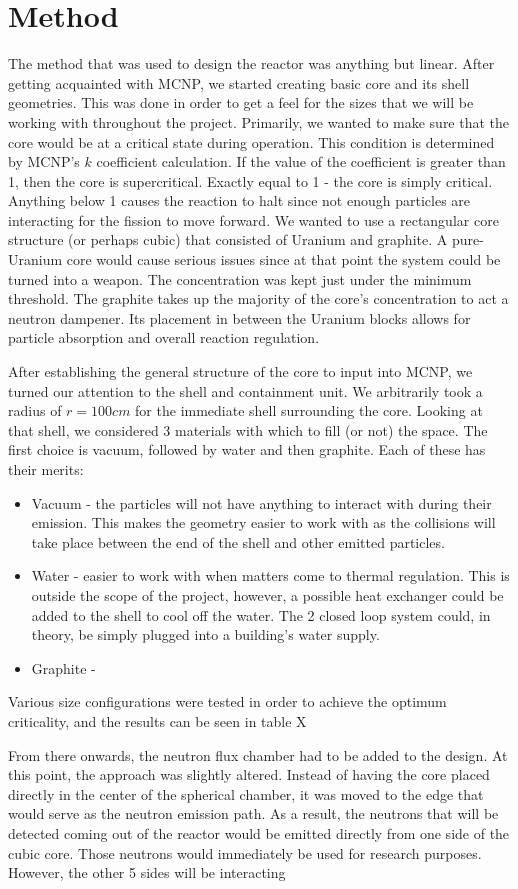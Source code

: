 \section*{Method}
The method that was used to design the reactor was anything but linear. After getting acquainted with MCNP, we started creating basic core and its shell geometries. This was done in order to get a feel for the sizes that we will be working with throughout the project. Primarily, we wanted to make sure that the core would be at a critical state during operation. This condition is determined by MCNP's $k$ coefficient calculation. If the value of the coefficient is greater than 1, then the core is supercritical. Exactly equal to 1 - the core is simply critical. Anything below 1 causes the reaction to halt since not enough particles are interacting for the fission to move forward. We wanted to use a rectangular core structure (or perhaps cubic) that consisted of Uranium and graphite. A pure-Uranium core would cause serious issues since at that point the system could be turned into a weapon. The concentration was kept just under the minimum threshold. The graphite takes up the majority of the core's concentration to act a neutron dampener. Its placement in between the Uranium blocks allows for particle absorption and overall reaction regulation.

After establishing the general structure of the core to input into MCNP, we turned our attention to the shell and containment unit. We arbitrarily took a radius of $r=100cm$ for the immediate shell surrounding the core. Looking at that shell, we considered 3 materials with which to fill (or not) the space. The first choice is vacuum, followed by water and then graphite. Each of these has their merits:
\begin{itemize}
\item Vacuum - the particles will not have anything to interact with during their emission. This makes the geometry easier to work with as the collisions will take place between the end of the shell and other emitted particles.
\item Water - easier to work with when matters come to thermal regulation. This is outside the scope of the project, however, a possible heat exchanger could be added to the shell to cool off the water. The 2 closed loop system could, in theory, be simply plugged into a building's water supply.
\item Graphite - 
\end{itemize}

Various size configurations were tested in order to achieve the optimum criticality, and the results can be seen in table X %

From there onwards, the neutron flux chamber had to be added to the design. At this point, the approach was slightly altered. Instead of having the core placed directly in the center of the spherical chamber, it was moved to the edge that would serve as the neutron emission path. As a result, the neutrons that will be detected coming out of the reactor would be emitted directly from one side of the cubic core. Those neutrons would immediately be used for research purposes. However, the other 5 sides will be interacting 